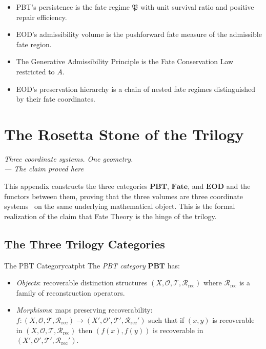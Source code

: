 \documentclass[12pt,twoside,openright]{book}
\newcommand{\transfam}{\mathcal{T}}       %
\newcommand{\recon}{\mathcal{R}_{\mathrm{rec}}}   %
\newcommand{\obs}{\mathcal{O}}
\newcommand{\admRegion}{A}
\newcommand{\catFate}{\mathbf{Fate}}
\newenvironment{epigraph}[2]{%
  \vspace{1em}\begin{flushright}
  \begin{minipage}{0.72\textwidth}
  \itshape\small #1\\[0.4em]
  \upshape\footnotesize\sffamily\color{DistGray}--- #2
  \end{minipage}\end{flushright}\vspace{1.5em}}{}
\providecommand{\admRegion}{A}
\providecommand{\catFate}{\mathbf{Fate}}
\newenvironment{appsummary}{%
  \begin{tcolorbox}[colback=DistBlue!5,colframe=DistBlue,
    title={\faBookOpen\enspace Appendix Summary},
    fonttitle=\sffamily\bfseries\color{white},
    attach boxed title to top left={yshift=-2mm,xshift=4mm},
    boxed title style={colback=DistBlue,rounded corners}]
  \begin{itemize}[nosep,leftmargin=*]}{%
  \end{itemize}\end{tcolorbox}}
\providecommand{\catPBT}{\mathbf{PBT}}
\providecommand{\catEOD}{\mathbf{EOD}}
\providecommand{\persRegime}{\mathfrak{P}}
\begin{document}
\begin{appsummary}
\item PBT's persistence is the fate regime $\persRegime$
  with unit survival ratio and positive repair efficiency.
\item EOD's admissibility volume is the pushforward fate
  measure of the admissible fate region.
\item The Generative Admissibility Principle is the Fate
  Conservation Law restricted to $\admRegion$.
\item EOD's preservation hierarchy is a chain of nested
  fate regimes distinguished by their fate coordinates.
\end{appsummary}


\chapter{The Rosetta Stone of the Trilogy}
\label{app:rosetta}

\begin{epigraph}{Three coordinate systems. One geometry.}%
  {The claim proved here}
\end{epigraph}

This appendix constructs the three categories $\catPBT$,
$\catFate$, and $\catEOD$ and the functors between them,
proving that the three volumes are three coordinate systems~\cite{bateson1972}
on the same underlying mathematical object. This is the
formal realization of the claim that Fate Theory is the
hinge of the trilogy.

\section{The Three Trilogy Categories}

\begin{definition}{The PBT Category}{catpbt}
The \emph{PBT category} $\catPBT$ has:
\begin{itemize}[nosep,leftmargin=2em]
  \item \emph{Objects}: recoverable distinction structures
    $(X,\obs,\transfam,\recon)$ where $\recon$ is a family
    of reconstruction operators.
  \item \emph{Morphisms}: maps preserving recoverability:
    $f:(X,\obs,\transfam,\recon)\to(X',\obs',\transfam',
    \recon')$ such that if $(x,y)$ is recoverable in
    $(X,\obs,\transfam,\recon)$ then $(f(x),f(y))$ is
    recoverable in $(X',\obs',\transfam',\recon')$.
\end{itemize}
\end{definition}
\end{document}
